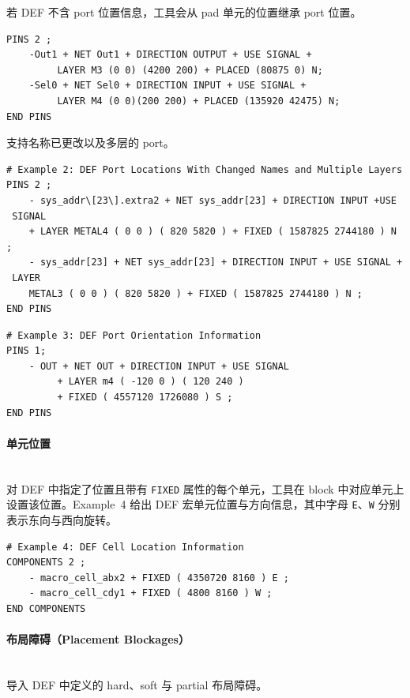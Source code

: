 \begin{noteBox}
若 DEF 不含 port 位置信息，工具会从 pad 单元的位置继承 port 位置。
\end{noteBox}


\begin{lstlisting}
PINS 2 ;
    -Out1 + NET Out1 + DIRECTION OUTPUT + USE SIGNAL +
         LAYER M3 (0 0) (4200 200) + PLACED (80875 0) N;
    -Sel0 + NET Sel0 + DIRECTION INPUT + USE SIGNAL +
         LAYER M4 (0 0)(200 200) + PLACED (135920 42475) N;
END PINS
\end{lstlisting}

支持名称已更改以及多层的 port。

\begin{lstlisting}
# Example 2: DEF Port Locations With Changed Names and Multiple Layers
PINS 2 ;
    - sys_addr\[23\].extra2 + NET sys_addr[23] + DIRECTION INPUT +USE
 SIGNAL
    + LAYER METAL4 ( 0 0 ) ( 820 5820 ) + FIXED ( 1587825 2744180 ) N ;
    - sys_addr[23] + NET sys_addr[23] + DIRECTION INPUT + USE SIGNAL +
 LAYER
    METAL3 ( 0 0 ) ( 820 5820 ) + FIXED ( 1587825 2744180 ) N ;
END PINS
\end{lstlisting}

\begin{lstlisting}
# Example 3: DEF Port Orientation Information
PINS 1;
    - OUT + NET OUT + DIRECTION INPUT + USE SIGNAL
         + LAYER m4 ( -120 0 ) ( 120 240 )
         + FIXED ( 4557120 1726080 ) S ;
END PINS
\end{lstlisting}

\paragraph{单元位置}\mbox{}\\
对 DEF 中指定了位置且带有 \texttt{FIXED} 属性的每个单元，工具在 block 中对应单元上设置该位置。Example~4 给出 DEF 宏单元位置与方向信息，其中字母 \texttt{E}、\texttt{W} 分别表示东向与西向旋转。

\begin{lstlisting}
# Example 4: DEF Cell Location Information
COMPONENTS 2 ;
    - macro_cell_abx2 + FIXED ( 4350720 8160 ) E ;
    - macro_cell_cdy1 + FIXED ( 4800 8160 ) W ;
END COMPONENTS
\end{lstlisting}

\paragraph{布局障碍（Placement Blockages）}\mbox{}\\
 导入 DEF 中定义的 hard、soft 与 partial 布局障碍。

